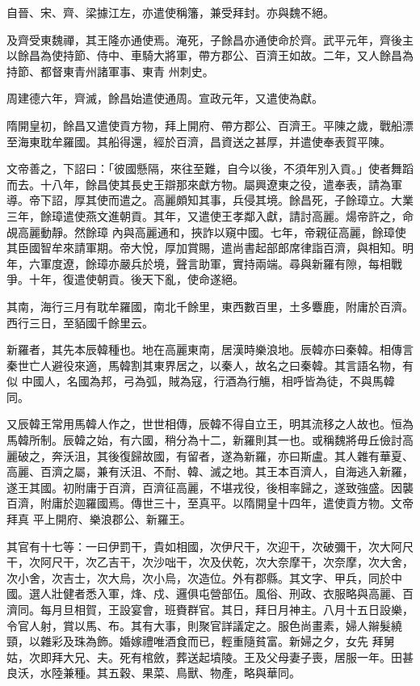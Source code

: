\begin{pinyinscope}
 自晉、宋、齊、梁據江左，亦遣使稱籓，兼受拜封。亦與魏不絕。



 及齊受東魏禪，其王隆亦通使焉。淹死，子餘昌亦通使命於齊。武平元年，齊後主以餘昌為使持節、侍中、車騎大將軍，帶方郡公、百濟王如故。二年，又人餘昌為持節、都督東青州諸軍事、東青
 州刺史。



 周建德六年，齊滅，餘昌始遣使通周。宣政元年，又遣使為獻。



 隋開皇初，餘昌又遣使貢方物，拜上開府、帶方郡公、百濟王。平陳之歲，戰船漂至海東耽牟羅國。其船得還，經於百濟，昌資送之甚厚，并遣使奉表賀平陳。



 文帝善之，下詔曰：「彼國懸隔，來往至難，自今以後，不須年別入貢。」使者舞蹈而去。十八年，餘昌使其長史王辯那來獻方物。屬興遼東之役，遣奉表，請為軍導。帝下詔，厚其使而遣之。高麗頗知其事，兵侵其境。餘昌死，子餘璋立。大業三年，餘璋遣使燕文進朝貢。其年，又遣使王孝鄰入獻，請討高麗。煬帝許之，命覘高麗動靜。然餘璋
 內與高麗通和，挾詐以窺中國。七年，帝親征高麗，餘璋使其臣國智牟來請軍期。帝大悅，厚加賞賜，遣尚書起部郎席律詣百濟，與相知。明年，六軍度遼，餘璋亦嚴兵於境，聲言助軍，實持兩端。尋與新羅有隙，每相戰爭。十年，復遣使朝貢。後天下亂，使命遂絕。



 其南，海行三月有耽牟羅國，南北千餘里，東西數百里，土多麞鹿，附庸於百濟。西行三日，至貊國千餘里云。



 新羅者，其先本辰韓種也。地在高麗東南，居漢時樂浪地。辰韓亦曰秦韓。相傳言秦世亡人避役來適，馬韓割其東界居之，以秦人，故名之曰秦韓。其言語名物，有似
 中國人，名國為邦，弓為弧，賊為寇，行酒為行觴，相呼皆為徒，不與馬韓同。



 又辰韓王常用馬韓人作之，世世相傳，辰韓不得自立王，明其流移之人故也。恒為馬韓所制。辰韓之始，有六國，稍分為十二，新羅則其一也。或稱魏將毋丘儉討高麗破之，奔沃沮，其後復歸故國，有留者，遂為新羅，亦曰斯盧。其人雜有華夏、高麗、百濟之屬，兼有沃沮、不耐、韓、滅之地。其王本百濟人，自海逃入新羅，遂王其國。初附庸于百濟，百濟征高麗，不堪戎役，後相率歸之，遂致強盛。因襲百濟，附庸於迦羅國焉。傳世三十，至真平。以隋開皇十四年，遣使貢方物。文帝拜真
 平上開府、樂浪郡公、新羅王。



 其官有十七等：一曰伊罰干，貴如相國，次伊尺干，次迎干，次破彌干，次大阿尺干，次阿尺干，次乙吉干，次沙咄干，次及伏乾，次大奈摩干，次奈摩，次大舍，次小舍，次吉士，次大烏，次小烏，次造位。外有郡縣。其文字、甲兵，同於中國。選人壯健者悉入軍，烽、戍、邏俱屯營部伍。風俗、刑政、衣服略與高麗、百濟同。每月旦相賀，王設宴會，班賚群官。其日，拜日月神主。八月十五日設樂，令官人射，賞以馬、布。其有大事，則聚官詳議定之。服色尚畫素，婦人辮髮繞頸，以雜彩及珠為飾。婚嫁禮唯酒食而已，輕重隨貧富。新婦之夕，女先
 拜舅姑，次即拜大兄、夫。死有棺斂，葬送起墳陵。王及父母妻子喪，居服一年。田甚良沃，水陸兼種。其五穀、果菜、鳥獸、物產，略與華同。




\end{pinyinscope}

